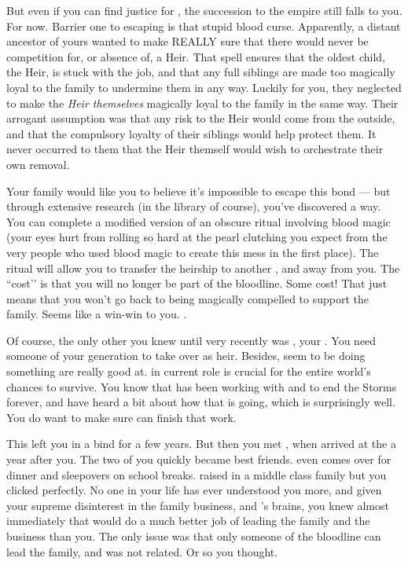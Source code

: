 \documentclass[char]{GL2020}
\begin{document}
But even if you can find justice for \cHeirSibling{}, the succession to the \cHeir{\formal} empire still falls to you. For now. Barrier one to escaping is that stupid blood curse. Apparently, a distant ancestor of yours wanted to make REALLY sure that there would never be competition for, or absence of, a \cHeir{\formal} Heir. That spell ensures that the oldest child, the Heir, is stuck with the job, and that any full siblings are made too magically loyal to the family to undermine them in any way. Luckily for you, they neglected to make the \emph{Heir themselves} magically loyal to the family in the same way. Their arrogant assumption was that any risk to the Heir would come from the outside, and that the compulsory loyalty of their siblings would help protect them. It never occurred to them that the Heir themself would wish to orchestrate their own removal. 

Your family would like you to believe it's impossible to escape this bond — but through extensive research (in the library of course), you've discovered a way. You can complete a modified version of an obscure ritual involving blood magic (your eyes hurt from rolling so hard at the pearl clutching you expect from the very people who used blood magic to create this mess in the first place). The ritual will allow you to transfer the heirship to another \cHeir{\formal}, and away from you. The ``cost’’ is that you will no longer be part of the bloodline. Some cost! That just means that you won’t go back to being magically compelled to support the family. Seems like a win-win to you. . 

Of course, the only other \cHeir{\formal} you knew until very recently was \cDiplomat{\full}, your \cDiplomat{\auncle}. You need someone of your generation to take over as heir.  Besides,\cDiplomat{\they} seem\cDiplomat{\verbs} to be doing something \cDiplomat{\they} are really good at. \cDiplomat{} in \cDiplomat{\their} current role is crucial for the entire world’s chances to survive. You know that \Diplomat{} has been working with \cHeadScientist{\full} and \cAssistantScientist{\full} to end the Storms forever, and have heard a bit about how that is going, which is surprisingly well. You do want to make sure \cDiplomat{} can finish that work.

This left you in a bind for a few years. But then you met \cAmbition{}, when \cAmbition{\they} arrived at the \pSc{} a year after you. The two of you quickly became best friends. \cAmbition{} even comes over for dinner and sleepovers on school breaks. \cAmbition{\They} \cAmbition{\were} raised in a middle class family but you clicked perfectly. No one in your life has ever understood you more, and given your supreme disinterest in the family business, and \cAmbition{}’s brains, you knew almost immediately that \cAmbition{\they} would do a much better job of leading the family and the business than you. The only issue was that only someone of the \cHeir{\formal} bloodline can lead the family, and \cAmbition{} was not related. Or so you thought.  
\end{document}
